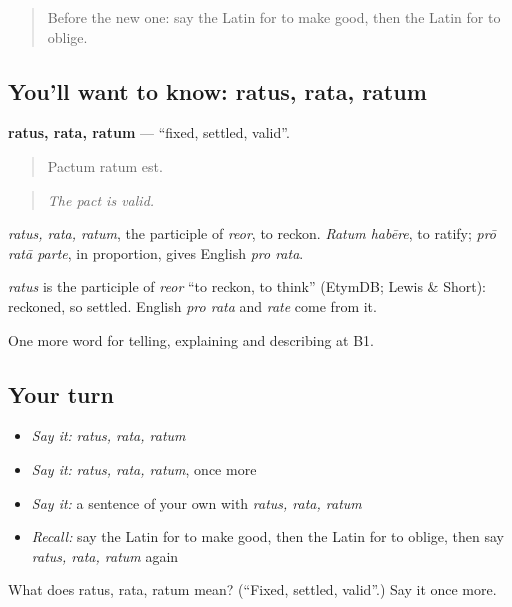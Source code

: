 \begin{quote}
Before the new one: say the Latin for to make good, then the Latin for to oblige.
\end{quote}

\subsection*{You'll want to know: ratus, rata, ratum}
\textbf{ratus, rata, ratum} — \textquotedblleft{}fixed, settled, valid\textquotedblright{}.

\begin{quote}
Pactum ratum est.
\end{quote}

\begin{quote}
\emph{The pact is valid.}
\end{quote}

\emph{ratus, rata, ratum}, the participle of \emph{reor}, to reckon. \emph{Ratum habēre}, to ratify; \emph{prō ratā parte}, in proportion, gives English \emph{pro rata}.

\begin{cousinweb}
\emph{ratus} is the participle of \emph{reor} \textquotedblleft{}to reckon, to think\textquotedblright{} (EtymDB; Lewis \& Short): reckoned, so settled. English \emph{pro rata} and \emph{rate} come from it.
\end{cousinweb}

\begin{grammarlens}[title={What you've built}]
One more word for telling, explaining and describing at B1.
\end{grammarlens}

\subsection*{Your turn}
\begin{itemize}
\raggedright
  \item \emph{Say it:} \emph{ratus, rata, ratum}
  \item \emph{Say it:} \emph{ratus, rata, ratum}, once more
  \item \emph{Say it:} a sentence of your own with \emph{ratus, rata, ratum}
  \item \emph{Recall:} say the Latin for to make good, then the Latin for to oblige, then say \emph{ratus, rata, ratum} again
\end{itemize}

\begin{tcolorbox}[breakable,colback=teal!4,colframe=teal!35!black,title={Before you move on}]
What does ratus, rata, ratum mean? (\textquotedblleft{}Fixed, settled, valid\textquotedblright{}.) Say it once more.
\end{tcolorbox}
